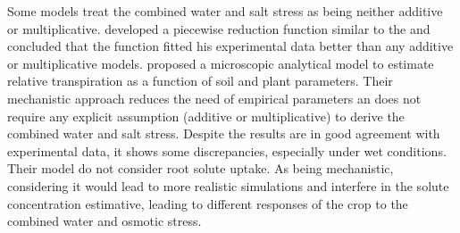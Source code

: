 Some models treat the combined water and salt stress as being neither additive or multiplicative. \citeonline[homaee] developed a piecewise reduction function similar to the \citeonline[feddes78] and concluded that the function fitted his experimental data better than any additive or multiplicative models.
\citeonline[liersolute] proposed a microscopic analytical model to estimate relative transpiration as a function of soil and plant parameters. 
Their mechanistic approach reduces the need of empirical parameters an does not require any explicit assumption (additive or multiplicative) to derive the combined water and salt stress. 
Despite the results are in good agreement with experimental data, it shows some discrepancies, especially under wet conditions. 
Their model do not consider root solute uptake.
As being mechanistic, considering it would lead to more realistic simulations and interfere in the solute concentration estimative, leading to different responses of the crop to the combined water and osmotic stress.





